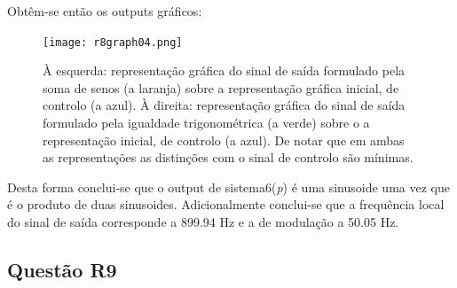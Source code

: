 \documentclass[a4paper,12pt]{article}
\begin{document}
			\newpage
			Obtêm-se então os outputs gráficos:
			\begin{figure}[H]
                                      \centering
                                      \captionsetup{justification=centering}
                                      \texttt{[image: r8graph04.png]}
                               \caption{À esquerda: representação gráfica do sinal de saída formulado pela soma de senos (a laranja) sobre a representação gráfica inicial, de controlo (a azul). À direita: representação gráfica do sinal de saída formulado pela igualdade trigonométrica (a verde) sobre o a representação inicial, de controlo (a azul). De notar que em ambas as representações as distinções com o sinal de controlo são mínimas.}
                              \end{figure}
			Desta forma conclui-se que o output de sistema6(\textit{p}) é uma sinusoide uma vez que é o produto de duas sinusoides. Adicionalmente conclui-se que a frequência local do sinal de saída corresponde a 899.94 Hz e a de modulação a 50.05 Hz.

			\newpage
			\subsection{Questão R9}
\end{document}
